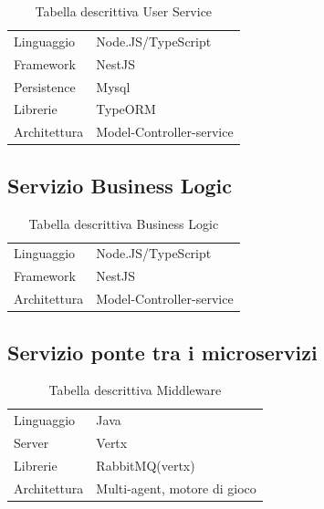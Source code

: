 \begin{table}[h!]
    \centering
    \caption{Tabella descrittiva User Service}
    \label{tab:user_serv_table}
    \begin{tabular}{ll}     
        \toprule                   
        Linguaggio & Node.JS/TypeScript \\        
        Framework & NestJS   \\                   
        Persistence & Mysql  \\
        Librerie & TypeORM   \\
        Architettura & Model-Controller-service  \\
        \bottomrule
    \end{tabular}
\end{table}


\subsection{Servizio Business Logic}

\begin{table}[h!]
    \centering
    \caption{Tabella descrittiva Business Logic}
    \label{tab:bl_serv_table}
    \begin{tabular}{ll}     
        \toprule                   
        Linguaggio & Node.JS/TypeScript \\        
        Framework & NestJS   \\                   
        Architettura & Model-Controller-service  \\
        \bottomrule
    \end{tabular}
\end{table}

\subsection{Servizio ponte tra i microservizi}


\begin{table}[h!]
    \centering
    \caption{Tabella descrittiva Middleware}
    \label{tab:middleware_serv_table}
    \begin{tabular}{ll}     
        \toprule                   
        Linguaggio & Java \\        
        Server & Vertx \\
        Librerie & RabbitMQ(vertx) \\
        Architettura & Multi-agent, motore di gioco \\
        \bottomrule
    \end{tabular}
\end{table}

